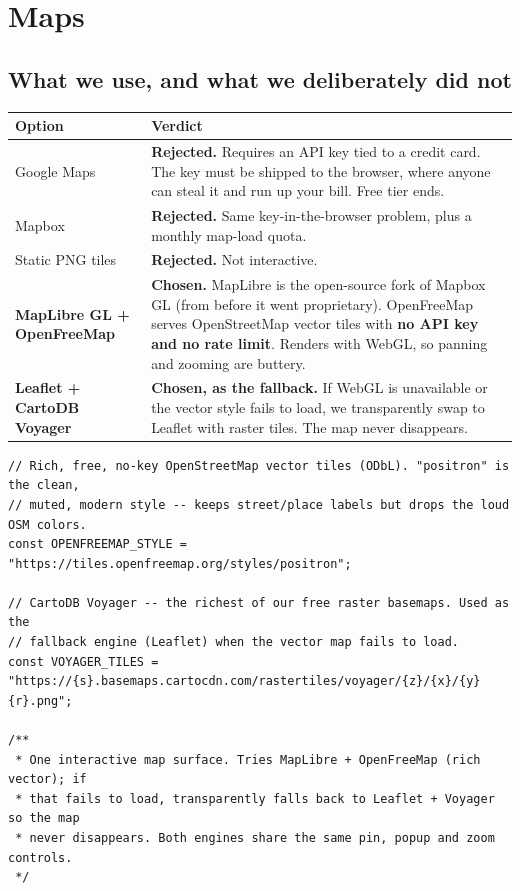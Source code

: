 \documentclass[11pt,a4paper]{article}
\begin{document}
\newpage
\section{Maps}

\subsection{What we use, and what we deliberately did not}

\begin{longtable}{@{}p{3.2cm}p{11.6cm}@{}}
\toprule
\textbf{Option} & \textbf{Verdict} \\
\midrule
\endhead
Google Maps & \textbf{Rejected.} Requires an API key tied to a credit card. The
key must be shipped to the browser, where anyone can steal it and run up your
bill. Free tier ends. \\
\addlinespace
Mapbox & \textbf{Rejected.} Same key-in-the-browser problem, plus a monthly
map-load quota. \\
\addlinespace
Static PNG tiles & \textbf{Rejected.} Not interactive. \\
\addlinespace
\textbf{MapLibre GL + OpenFreeMap} & \textbf{Chosen.} MapLibre is the open-source
fork of Mapbox GL (from before it went proprietary). OpenFreeMap serves
OpenStreetMap vector tiles with \textbf{no API key and no rate limit}. Renders
with WebGL, so panning and zooming are buttery. \\
\addlinespace
\textbf{Leaflet + CartoDB Voyager} & \textbf{Chosen, as the fallback.} If WebGL is
unavailable or the vector style fails to load, we transparently swap to Leaflet
with raster tiles. The map never disappears. \\
\bottomrule
\end{longtable}

\begin{lstlisting}[language=TS,caption={components/LocationMap.tsx}]
// Rich, free, no-key OpenStreetMap vector tiles (ODbL). "positron" is the clean,
// muted, modern style -- keeps street/place labels but drops the loud OSM colors.
const OPENFREEMAP_STYLE = "https://tiles.openfreemap.org/styles/positron";

// CartoDB Voyager -- the richest of our free raster basemaps. Used as the
// fallback engine (Leaflet) when the vector map fails to load.
const VOYAGER_TILES = "https://{s}.basemaps.cartocdn.com/rastertiles/voyager/{z}/{x}/{y}{r}.png";

/**
 * One interactive map surface. Tries MapLibre + OpenFreeMap (rich vector); if
 * that fails to load, transparently falls back to Leaflet + Voyager so the map
 * never disappears. Both engines share the same pin, popup and zoom controls.
 */
\end{lstlisting}
\end{document}
